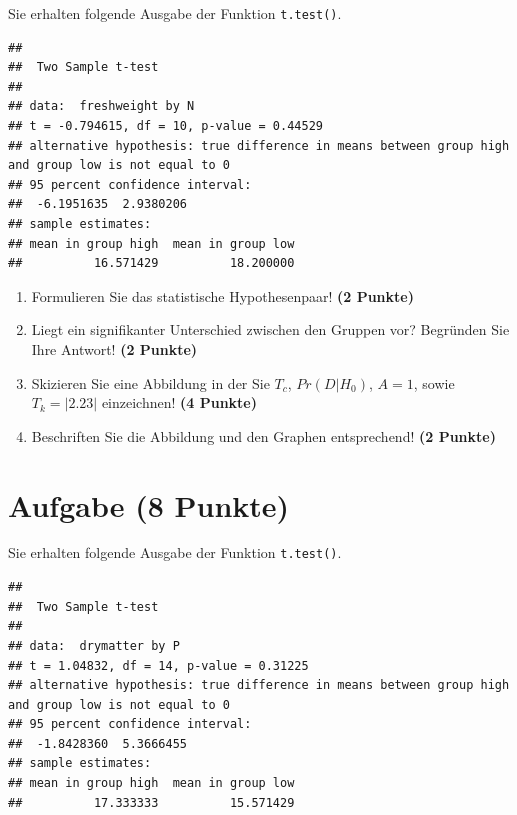 \documentclass[a4paper, 10pt]{scrartcl}\usepackage[]{graphicx}\usepackage[]{xcolor}
\makeatletter
\newenvironment{kframe}{%
 \def\at@end@of@kframe{}%
 \ifinner\ifhmode%
  \def\at@end@of@kframe{\end{minipage}}%
  \begin{minipage}{\columnwidth}%
 \fi\fi%
 \def\FrameCommand##1{\hskip\@totalleftmargin \hskip-\fboxsep
 \colorbox{shadecolor}{##1}\hskip-\fboxsep
     \hskip-\linewidth \hskip-\@totalleftmargin \hskip\columnwidth}%
 \MakeFramed {\advance\hsize-\width
   \@totalleftmargin\z@ \linewidth\hsize
   \@setminipage}}%
 {\par\unskip\endMakeFramed%
 \at@end@of@kframe}
\newenvironment{knitrout}{}{} %
\makeatother
\begin{document}
Sie erhalten folgende \Rlogo Ausgabe der Funktion \texttt{t.test()}.

\begin{knitrout}
\color{fgcolor}\begin{kframe}
\begin{verbatim}
## 
## 	Two Sample t-test
## 
## data:  freshweight by N
## t = -0.794615, df = 10, p-value = 0.44529
## alternative hypothesis: true difference in means between group high and group low is not equal to 0
## 95 percent confidence interval:
##  -6.1951635  2.9380206
## sample estimates:
## mean in group high  mean in group low 
##          16.571429          18.200000
\end{verbatim}
\end{kframe}
\end{knitrout}


\begin{enumerate}
  \item Formulieren Sie das statistische Hypothesenpaar! \textbf{(2
Punkte)}
\item Liegt ein signifikanter Unterschied zwischen den Gruppen vor?
  Begr{\"u}nden Sie Ihre Antwort! \textbf{(2 Punkte)}
\item Skizieren Sie eine Abbildung in der Sie $T_c$, $Pr(D|H_0)$, $A=1$,
  sowie $T_k = |2.23|$ einzeichnen! \textbf{(4 Punkte)}
\item Beschriften Sie die Abbildung und
  den Graphen entsprechend! \textbf{(2 Punkte)}  
\end{enumerate} 
\clearpage

\section{Aufgabe \hfill (8 Punkte)}

Sie erhalten folgende \Rlogo Ausgabe der Funktion \texttt{t.test()}.

\begin{knitrout}
\color{fgcolor}\begin{kframe}
\begin{verbatim}
## 
## 	Two Sample t-test
## 
## data:  drymatter by P
## t = 1.04832, df = 14, p-value = 0.31225
## alternative hypothesis: true difference in means between group high and group low is not equal to 0
## 95 percent confidence interval:
##  -1.8428360  5.3666455
## sample estimates:
## mean in group high  mean in group low 
##          17.333333          15.571429
\end{verbatim}
\end{kframe}
\end{knitrout}
\end{document}
